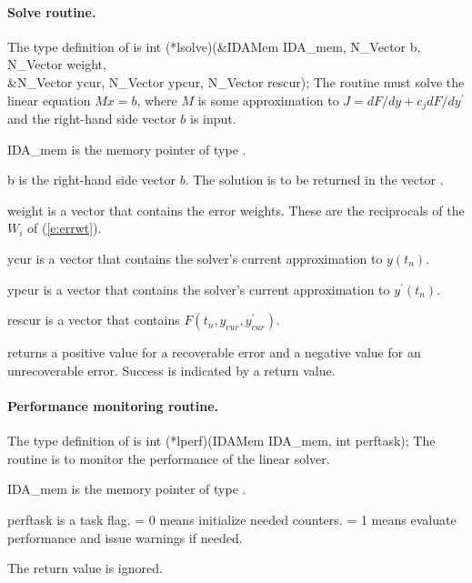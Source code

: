 
\paragraph{Solve routine.}
The type definition of  is
{
  int (*lsolve)(&IDAMem IDA\_mem, N\_Vector b, N\_Vector weight, \\
                &N\_Vector ycur, N\_Vector ypcur, N\_Vector rescur);  
}
{
  The routine  must solve the linear equation $M x = b$, where         
  $M$ is some approximation to $J = dF/dy + c_j dF/dy^\prime$  
  and the right-hand side vector $b$ is input. 
}
{
  \begin{args}
  \item[IDA\_mem]
    is the {\ida} memory pointer of type .
  \item[b]
    is the right-hand side vector $b$. The solution is to be    
    returned in the vector .
  \item[weight]
    is a vector that contains the error weights.
    These are the reciprocals of the $W_i$ of (\ref{e:errwt}).
  \item[ycur]
    is a vector that contains the solver's current approximation to $y(t_n)$.
  \item[ypcur]
    is a vector that contains the solver's current approximation to $y^\prime(t_n)$.
  \item[rescur]
    is a vector that contains $F(t_n,y_{cur},y_{cur}^\prime)$. 
  \end{args}
}
{
   returns a positive value    
  for a recoverable error and a negative value for an             
  unrecoverable error. Success is indicated by a  return value.
}
{}


\paragraph{Performance monitoring routine.}
The type definition of  is
{
  int (*lperf)(IDAMem IDA\_mem, int perftask);
}
{
  The routine  is to monitor the performance of the linear solver.
}
{
  \begin{args}
  \item[IDA\_mem]
    is the {\ida} memory pointer of type .
  \item[perftask]
    is a task flag.   = 0 means initialize needed counters.
     = 1 means evaluate performance and issue warnings if needed.
  \end{args}
}
{
  The  return value is ignored.
}
{}

